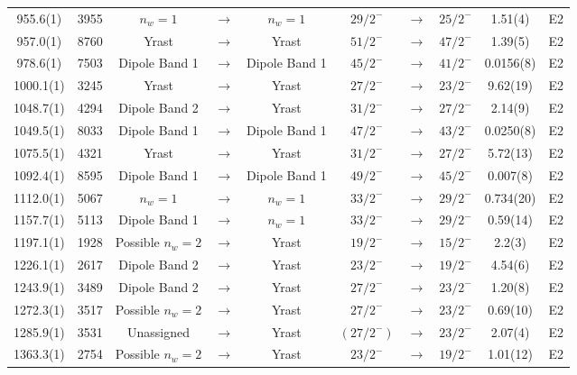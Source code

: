 \begin{landscape}
\begin{center}
\begin{longtable}{|c|c|ccc|ccc|c|c|}
 955.6(1) & 3955 & $n_w=1$ & $ \rightarrow $ & $n_w=1$ & $ 29/2^{-} $ & $ \rightarrow $ & $ 25/2^{-} $ & 1.51(4) & E2 \\
 957.0(1) & 8760 & Yrast & $ \rightarrow $ & Yrast & $ 51/2^{-} $ & $ \rightarrow $ & $ 47/2^{-} $ & 1.39(5) & E2 \\
 978.6(1) & 7503 & Dipole Band 1 & $ \rightarrow $ & Dipole Band 1 & $ 45/2^{-} $ & $ \rightarrow $ & $ 41/2^{-} $ & 0.0156(8) & E2 \\
 1000.1(1) & 3245 & Yrast & $ \rightarrow $ & Yrast & $ 27/2^{-} $ & $ \rightarrow $ & $ 23/2^{-} $ & 9.62(19) & E2 \\
 1048.7(1) & 4294 & Dipole Band 2 & $ \rightarrow $ & Yrast & $ 31/2^{-} $ & $ \rightarrow $ & $ 27/2^{-} $ & 2.14(9) & E2 \\
 1049.5(1) & 8033 & Dipole Band 1 & $ \rightarrow $ & Dipole Band 1 & $ 47/2^{-} $ & $ \rightarrow $ & $ 43/2^{-} $ & 0.0250(8) & E2 \\
 1075.5(1) & 4321 & Yrast & $ \rightarrow $ & Yrast & $ 31/2^{-} $ & $ \rightarrow $ & $ 27/2^{-} $ & 5.72(13) & E2 \\
 1092.4(1) & 8595 & Dipole Band 1 & $ \rightarrow $ & Dipole Band 1 & $ 49/2^{-} $ & $ \rightarrow $ & $ 45/2^{-} $ & 0.007(8) & E2 \\
 1112.0(1) & 5067 & $n_w=1$ & $ \rightarrow $ & $n_w=1$ & $ 33/2^{-} $ & $ \rightarrow $ & $ 29/2^{-} $ & 0.734(20) & E2 \\
 1157.7(1) & 5113 & Dipole Band 1 & $ \rightarrow $ & $n_w=1$ & $ 33/2^{-} $ & $ \rightarrow $ & $ 29/2^{-} $ & 0.59(14) & E2 \\
 1197.1(1) & 1928 & Possible $n_w=2$ & $ \rightarrow $ & Yrast & $ 19/2^{-} $ & $ \rightarrow $ & $ 15/2^{-} $ & 2.2(3) & E2 \\
 1226.1(1) & 2617 & Dipole Band 2 & $ \rightarrow $ & Yrast & $ 23/2^{-} $ & $ \rightarrow $ & $ 19/2^{-} $ & 4.54(6) & E2 \\
 1243.9(1) & 3489 & Dipole Band 2 & $ \rightarrow $ & Yrast & $ 27/2^{-} $ & $ \rightarrow $ & $ 23/2^{-} $ & 1.20(8) & E2 \\
 1272.3(1) & 3517 & Possible $n_w=2$ & $ \rightarrow $ & Yrast & $ 27/2^{-} $ & $ \rightarrow $ & $ 23/2^{-} $ & 0.69(10) & E2 \\
 1285.9(1) & 3531 & Unassigned & $ \rightarrow $ & Yrast & $ (27/2^{-}) $ & $ \rightarrow $ & $ 23/2^{-} $ & 2.07(4) & E2 \\
 1363.3(1) & 2754 & Possible $n_w=2$ & $ \rightarrow $ & Yrast & $ 23/2^{-} $ & $ \rightarrow $ & $ 19/2^{-} $ & 1.01(12) & E2 \\
\end{longtable}
\end{center}
\end{landscape}